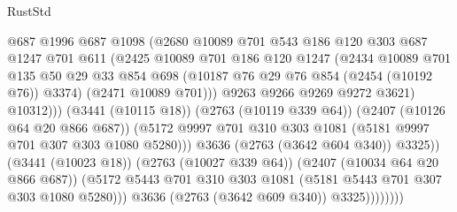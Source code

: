 \begin{lexlean}{RustStd}
\begin{coremodule}
                                  @687
                                  @1996
                                  @687
                                  @1098
                                  (@2680
                                    @10089
                                    @701
                                    @543
                                    @186
                                    @120
                                    @303
                                    @687
                                    @1247
                                    @701
                                    @611
                                    (@2425
                                      @10089
                                      @701
                                      @186
                                      @120
                                      @1247
                                      (@2434
                                        @10089
                                        @701
                                        @135
                                        @50
                                        @29
                                        @33
                                        @854
                                        @698
                                        (@10187 @76 @29 @76 @854 (@2454 (@10192 @76)) @3374)
                                        (@2471 @10089 @701)))
                                    @9263
                                    @9266
                                    @9269
                                    @9272
                                    @3621)
                                  @10312)))
                            (@3441 (@10115 @18))
                            (@2763 (@10119 @339 @64))
                            (@2407 (@10126 @64 @20 @866 @687))
                            (@5172
                              @9997
                              @701
                              @310
                              @303
                              @1081
                              (@5181 @9997 @701 @307 @303 @1080 @5280)))
                          @3636
                          (@2763 (@3642 @604 @340))
                          @3325))
                      (@3441 (@10023 @18))
                      (@2763 (@10027 @339 @64))
                      (@2407 (@10034 @64 @20 @866 @687))
                      (@5172 @5443 @701 @310 @303 @1081 (@5181 @5443 @701 @307 @303 @1080 @5280)))
                    @3636
                    (@2763 (@3642 @609 @340))
                    @3325))))))))

\end{coremodule}
\end{lexlean}
